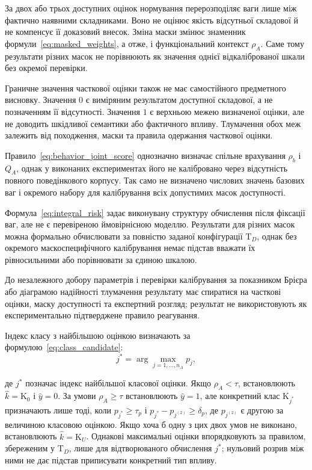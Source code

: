 За двох або трьох доступних оцінок нормування перерозподіляє ваги лише між фактично наявними складниками. Воно не оцінює якість відсутньої складової й не компенсує її доказовий внесок. Зміна маски змінює знаменник формули~\eqref{eq:masked_weights}, а отже, і функціональний контекст $\rho_A$. Саме тому результати різних масок не порівнюють як значення однієї відкаліброваної шкали без окремої перевірки.

Граничне значення часткової оцінки також не має самостійного предметного висновку. Значення $0$ є виміряним результатом доступної складової, а не позначенням її відсутності. Значення $1$ є верхньою межею визначеної оцінки, але не доводить шкідливої семантики або фактичного впливу. Тлумачення обох меж залежить від походження, маски та правила одержання часткової оцінки.

Правило~\eqref{eq:behavior_joint_score} однозначно визначає спільне врахування $\rho_b$ і $Q_A$, однак у виконаних експериментах його не калібровано через відсутність повного поведінкового корпусу. Так само не визначено числових значень базових ваг і окремого набору для калібрування всіх допустимих масок доступності.

Формула~\eqref{eq:integral_risk} задає виконувану структуру обчислення після фіксації ваг, але не є перевіреною ймовірнісною моделлю. Результати для різних масок можна формально обчислювати за повністю заданої конфігурації $\mathrm T_D$, однак без окремого маскоспецифічного калібрування немає підстав вважати їх рівносильними або порівнювати за єдиною шкалою.

До незалежного добору параметрів і перевірки калібрування за показником Брієра або діаграмою надійності тлумачення результату має спиратися на часткові оцінки, маску доступності та експертний розгляд; результат не використовують як експериментально підтверджене правило реагування.

Індекс класу з найбільшою оцінкою визначають за формулою~\eqref{eq:class_candidate}:
\begin{equation}
j^{*}=\arg\max_{j=1,\ldots,n_A}p_j,
\label{eq:class_candidate}
\end{equation}

де $j^{*}$ позначає індекс найбільшої класової оцінки. Якщо $\rho_A<\tau$, встановлюють $\hat k=\mathrm K_0$ і $\hat y=0$. За умови $\rho_A\geq\tau$ встановлюють $\hat y=1$, але конкретний клас $\mathrm K_{j^{*}}$ призначають лише тоді, коли $p_{j^{*}}\geq\tau_p$ і $p_{j^{*}}-p_{j^{(2)}}\geq\delta_p$, де $p_{j^{(2)}}$ є другою за величиною класовою оцінкою. Якщо хоча б одну з цих двох умов не виконано, встановлюють $\hat k=\mathrm K_U$. Однакові максимальні оцінки впорядковують за правилом, збереженим у $\mathrm T_D$, лише для відтворюваного обчислення $j^{*}$; нульовий розрив між ними не дає підстав приписувати конкретний тип впливу.

